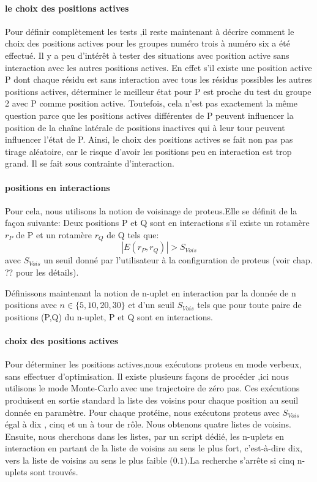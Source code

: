 \paragraph{le choix des positions actives}
\label{para:choix_posi}
Pour définir complètement les tests ,il reste maintenant à décrire comment le choix des positions actives pour les groupes numéro trois à numéro six a été effectué.
Il y a peu d'intérêt à tester des situations avec position active sans interaction avec les autres positions actives. 
En effet s'il existe une position active P dont chaque résidu est sans interaction avec tous les résidus possibles les autres positions actives, déterminer le meilleur état pour P est proche du test du groupe 2 avec P comme position active. Toutefois, cela n'est pas exactement la même question parce que les positions actives différentes de P peuvent influencer la position de la chaîne latérale de positions inactives qui à leur tour peuvent influencer l'état de P.
Ainsi, le choix des positions actives se fait non pas pas tirage aléatoire, car le risque d'avoir les positions peu en interaction est trop grand. Il se fait sous contrainte d'interaction.

\paragraph{positions en interactions}
Pour cela, nous utilisons la notion de voisinage de proteus.Elle se définit de la façon suivante:  
Deux positions P et Q sont en interactions s'il existe un rotamère $r_P$ de P et un rotamère $r_Q$ de Q tels que:
\begin{displaymath}
 | E(r_P,r_Q) | > S_{Vois}
\end{displaymath} 
avec $S_{Vois}$ un seuil donné par l'utilisateur à la configuration de proteus (voir chap. ?? pour les détails).

Définissons maintenant la notion de n-uplet en interaction par la donnée de n positions avec $n \in \{5,10,20,30\}$ et d'un seuil  $S_{Vois}$  tels que pour toute paire de positions (P,Q) du n-uplet, P et Q sont en interactions.
\paragraph{choix des  positions actives}
Pour déterminer les positions actives,nous exécutons proteus en mode verbeux, sans effectuer d'optimisation.
Il existe plusieurs façons de procéder ,ici nous utilisons le mode Monte-Carlo avec une trajectoire de zéro pas. Ces exécutions produisent en sortie standard la liste des voisins pour chaque position au seuil donnée en paramètre.
Pour chaque protéine, nous exécutons proteus avec  $S_{Vois}$ égal à dix , cinq et un à tour de rôle. Nous obtenons quatre listes de voisins. 
Ensuite, nous cherchons dans les listes, par un script dédié, les n-uplets en interaction en partant de la liste de voisins au sens le plus fort, c'est-à-dire dix, vers la liste de voisins au sens le plus faible ($0.1$).La recherche s'arrête si cinq n-uplets sont trouvés.


